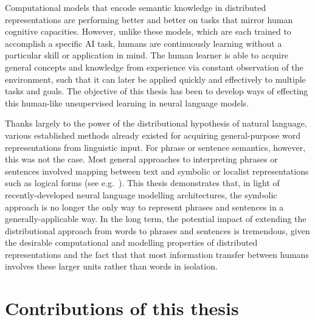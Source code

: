 
Computational models that encode semantic knowledge in distributed representations are performing better and better on tasks that mirror human cognitive capacities. However, unlike these models, which are each trained to accomplish a specific AI task, humans are continuously learning without a particular skill or application in mind. The human learner is able to acquire general concepts and knowledge from experience via constant observation of the environment, such that it can later be applied quickly and effectively to multiple tasks and goals. The objective of this thesis has been to develop ways of effecting this human-like unsupervised learning in neural language models.

Thanks largely to the power of the distributional hypothesis of natural language, various established methods already existed for acquiring general-purpose word representations from linguistic input. For phrase or sentence semantics, however, this was not the case. Most general approaches to interpreting phrases or sentences involved mapping between text and symbolic or localist representations such as logical forms (see e.g.~\citealt{poon2009unsupervised}). This thesis demonstrates that, in light of recently-developed neural language modelling architectures, the symbolic approach is no longer the only way to represent phrases and sentences in a generally-applicable way. In the long term, the potential impact of extending the distributional approach from words to phrases and sentences is tremendous, given the desirable computational and modelling properties of distributed representations and the fact that that most information transfer between humans involves these larger units rather than words in isolation. 

\section{Contributions of this thesis}

